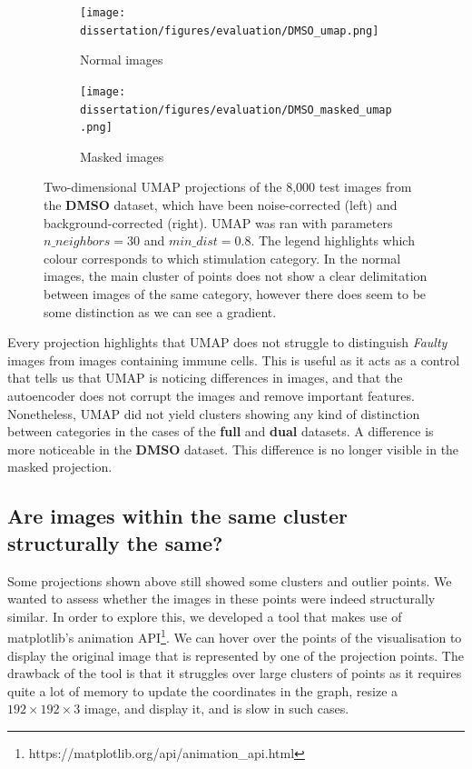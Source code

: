 \begin{figure}[h!]
    \centering
    \begin{subfigure}[h!]{0.4\textwidth}
        \texttt{[image: dissertation/figures/evaluation/DMSO\_umap.png]}
        \caption{Normal images}
    \end{subfigure}
    \begin{subfigure}[h!]{0.4\textwidth}
        \texttt{[image: dissertation/figures/evaluation/DMSO\_masked\_umap.png]}
        \caption{Masked images}
    \end{subfigure}
    \caption{Two-dimensional UMAP projections of the 8,000 test images from the \textbf{DMSO} dataset, which have been noise-corrected (left) and background-corrected (right). UMAP was ran with parameters $n\_neighbors=30$ and $min\_dist=0.8$. The legend highlights which colour corresponds to which stimulation category. In the normal images, the main cluster of points does not show a clear delimitation between images of the same category, however there does seem to be some distinction as we can see a gradient.}
    \label{fig:dmso_projection}
\end{figure}

Every projection highlights that UMAP does not struggle to distinguish \textit{Faulty} images from images containing immune cells. This is useful as it acts as a control that tells us that UMAP is noticing differences in images, and that the autoencoder does not corrupt the images and remove important features. Nonetheless, UMAP did not yield clusters showing any kind of distinction between categories in the cases of the \textbf{full} and \textbf{dual} datasets. A difference is more noticeable in the \textbf{DMSO} dataset. This difference is no longer visible in the masked projection. %

\subsection{Are images within the same cluster structurally the same?}

Some projections shown above still showed some clusters and outlier points. We wanted to assess whether the images in these points were indeed structurally similar. In order to explore this, we developed a tool that makes use of matplotlib's animation API\footnote{https://matplotlib.org/api/animation\_api.html}. We can hover over the points of the visualisation to display the original image that is represented by one of the projection points. The drawback of the tool is that it struggles over large clusters of points as it requires quite a lot of memory to update the coordinates in the graph, resize a $192\times192\times3$ image, and display it, and is slow in such cases. 

